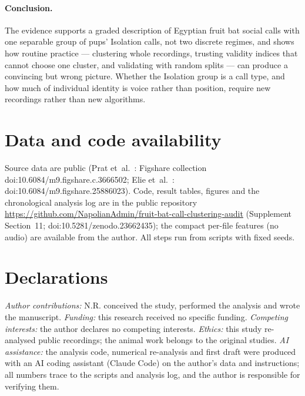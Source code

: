\paragraph{Conclusion.} The evidence supports a graded description of Egyptian fruit bat social calls with one separable group of pups' Isolation calls, not two discrete regimes, and shows how routine practice --- clustering whole recordings, trusting validity indices that cannot choose one cluster, and validating with random splits --- can produce a convincing but wrong picture. Whether the Isolation group is a call type, and how much of individual identity is voice rather than position, require new recordings rather than new algorithms.

\section*{Data and code availability}
Source data are public (Prat et~al.\ \cite{prat2017}: Figshare collection doi:10.6084/m9.figshare.c.3666502; Elie et~al.\ \cite{elie2024}: doi:10.6084/m9.figshare.25886023). Code, result tables, figures and the chronological analysis log are in the public repository \url{https://github.com/NapolianAdmin/fruit-bat-call-clustering-audit} (Supplement Section~11; doi:10.5281/zenodo.23662435); the compact per-file features (no audio) are available from the author. All steps run from scripts with fixed seeds.

\section*{Declarations}
\emph{Author contributions:} N.R. conceived the study, performed the analysis and wrote the manuscript. \emph{Funding:} this research received no specific funding. \emph{Competing interests:} the author declares no competing interests. \emph{Ethics:} this study re-analysed public recordings; the animal work belongs to the original studies. \emph{AI assistance:} the analysis code, numerical re-analysis and first draft were produced with an AI coding assistant (Claude Code) on the author's data and instructions; all numbers trace to the scripts and analysis log, and the author is responsible for verifying them.
